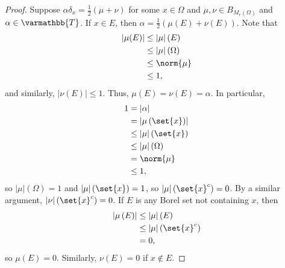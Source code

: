 \documentclass[10pt]{mypackage}
\renewcommand*{\mathbb}[1]{\varmathbb{#1}}
\begin{document}
\begin{proof}
  Suppose $\alpha \delta_x = \frac{1}{2}\left(\mu + \nu\right)$ for some $x\in \Omega$ and $\mu,\nu\in B_{M_{r}(\Omega)}$ and $\alpha\in \mathbb{T}$. If $x\in E$, then $\alpha = \frac{1}{2}\left(\mu(E) + \nu(E)\right)$. Note that
  \begin{align*}
    \left\vert \mu(E) \right\vert &\leq \left\vert \mu \right\vert(E)\\
                                  &\leq \left\vert \mu \right\vert(\Omega)\\
                                  &\leq \norm{\mu}\\
                                  &\leq 1,
  \end{align*}
  and similarly, $\left\vert \nu(E) \right\vert \leq 1$. Thus, $\mu(E) = \nu(E) = \alpha$. In particular,
  \begin{align*}
    1 &= \left\vert \alpha \right\vert\\
      &= \left\vert \mu\left(\set{x}\right) \right\vert\\
      &\leq \left\vert \mu \right\vert\left(\set{x}\right)\\
      &\leq \left\vert \mu \right\vert\left(\Omega\right)\\
      &= \norm{\mu}\\
      &\leq 1,
  \end{align*}
  so $\left\vert \mu \right\vert(\Omega) = 1$ and $\left\vert \mu \right\vert\left(\set{x}\right) = 1$, so $\left\vert \mu \right\vert\left(\set{x}^{c}\right) = 0$. By a similar argument, $\left\vert \nu \right\vert\left(\set{x}^c\right) = 0$. If $E$ is any Borel set not containing $x$, then
  \begin{align*}
    \left\vert \mu\left(E\right) \right\vert &\leq \left\vert \mu \right\vert\left(E\right)\\
                                             &\leq \left\vert \mu \right\vert\left(\set{x}^c\right)\\
                                             &=0,
  \end{align*}
  so $\mu(E) = 0$. Similarly, $\nu(E) = 0$ if $x\notin E$.\newline


\end{proof}
\end{document}
